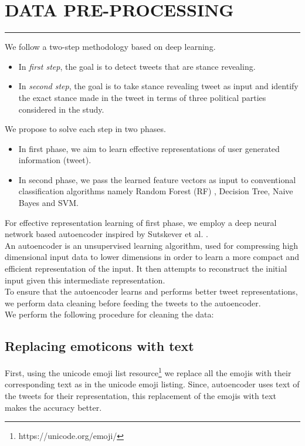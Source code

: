 \documentclass[a4paper,11pt]{article}
\begin{document}
\section{DATA PRE-PROCESSING}
\hrule
\vspace*{5mm}
We follow a two-step methodology based on deep learning. 
\begin{itemize}
    \item In \textit{first step}, the goal is to detect tweets that are stance revealing. 
    \item In \textit{second step}, the goal is to take stance revealing tweet as input and identify the exact stance made in the tweet in terms of three political parties considered in the study. 
\end{itemize}
We propose to solve each step in two phases. 
\begin{itemize}
    \item In first phase, we aim to learn effective representations of user generated information (tweet). 
    \item In second phase, we pass the learned feature vectors as input to conventional classification algorithms namely Random Forest (RF) , Decision Tree, Naive Bayes and SVM.
\end{itemize}
For effective representation learning of first phase, we employ a deep neural network based autoencoder inspired by Sutskever et al. \cite{sutskever2014sequence}. \medskip\\
An autoencoder is an unsupervised learning algorithm, used for compressing high dimensional input data to lower dimensions in order to learn a more compact and efficient representation of the input. It then attempts to reconstruct the initial input given this intermediate representation.\medskip\\
To ensure that the autoencoder learns and performs better tweet representations, we perform data cleaning before feeding the tweets to the autoencoder.\medskip\\
We perform the following procedure for cleaning the data:
\subsection{Replacing emoticons with text}
First, using the unicode emoji list
resource\footnote{https://unicode.org/emoji/} we replace all the emojis with their corresponding text as in the unicode emoji listing. Since, autoencoder uses text of the tweets for their representation, this replacement of the emojis with text makes the accuracy better.
\end{document}

